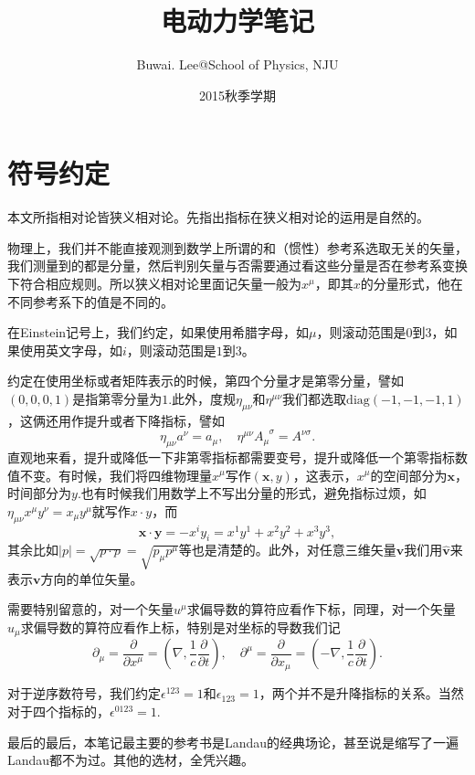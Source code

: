 \documentclass[9pt]{extbook}
\begin{document}
\title{电动力学笔记}
\author{Buwai. Lee@School of Physics, NJU}
\date{2015秋季学期}
\maketitle %
\frontmatter

\tableofcontents
\clearpage
\section*{符号约定}
本文所指相对论皆狭义相对论。先指出指标在狭义相对论的运用是自然的。

物理上，我们并不能直接观测到数学上所谓的和（惯性）参考系选取无关的矢量，我们测量到的都是分量，然后判别矢量与否需要通过看这些分量是否在参考系变换下符合相应规则。所以狭义相对论里面记矢量一般为$x^\mu$，即其$x$的分量形式，他在不同参考系下的值是不同的。

在Einstein记号上，我们约定，如果使用希腊字母，如$\mu$，则滚动范围是$0$到$3$，如果使用英文字母，如$i$，则滚动范围是$1$到$3$。

约定在使用坐标或者矩阵表示的时候，第四个分量才是第零分量，譬如$(0,0,0,1)$是指第零分量为$1$.此外，度规$\eta_{\mu\nu}$和$\eta^{\mu\nu}$我们都选取$\mathrm{diag}(-1,-1,-1,1)$，这俩还用作提升或者下降指标，譬如
\[
\eta_{\mu\nu}a^\nu=a_\mu,\quad \eta^{\mu\nu}A_\mu^{\phantom{\mu}\sigma}=A^{\nu\sigma}.
\]
直观地来看，提升或降低一下非第零指标都需要变号，提升或降低一个第零指标数值不变。有时候，我们将四维物理量$x^\mu$写作$(\bm{x},y)$，这表示，$x^\mu$的空间部分为$\bm{x}$，时间部分为$y$.也有时候我们用数学上不写出分量的形式，避免指标过烦，如$\eta_{\mu\nu}x^\mu y^\nu=x_\mu y^\mu$就写作$x\cdot y$，而\[\bm{x}\cdot \bm{y}=-x^i y_i=x^1y^1+x^2y^2+x^3y^3,\]
其余比如$|p|=\sqrt{p\cdot p}=\sqrt{p_\mu p^\mu}$等也是清楚的。此外，对任意三维矢量$\bm{v}$我们用$\hat{\bm{v}}$来表示$\bm{v}$方向的单位矢量。

需要特别留意的，对一个矢量$u^\mu$求偏导数的算符应看作下标，同理，对一个矢量$u_\mu$求偏导数的算符应看作上标，特别是对坐标的导数我们记
\[
	\partial_\mu=\frac{\partial}{\partial x^\mu}=\left(\nabla,\frac{1}{c} \frac{\partial}{\partial t}\right),\quad \partial^\mu=\frac{\partial}{\partial x_\mu}=\left(-\nabla,\frac{1}{c} \frac{\partial}{\partial t}\right).
\]

对于逆序数符号，我们约定$\epsilon^{123}=1$和$\epsilon_{123}=1$，两个并不是升降指标的关系。当然对于四个指标的，$\epsilon^{0123}=1$.

最后的最后，本笔记最主要的参考书是Landau的经典场论，甚至说是缩写了一遍Landau都不为过。其他的选材，全凭兴趣。
\end{document}
